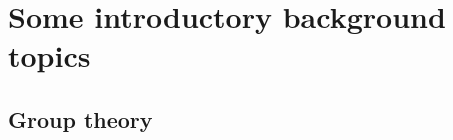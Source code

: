 \clearpage{\thispagestyle{empty}}
\section{Some introductory background topics}

\subsection{Group theory}



%
%
%
%
%
